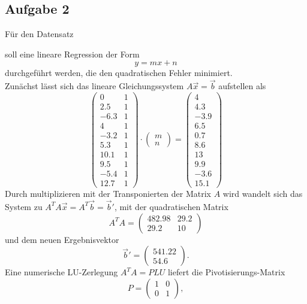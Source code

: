 \documentclass{scrartcl}
\begin{document}
\newpage
\subsection*{Aufgabe 2}
Für den Datensatz
\begin{table}[]
    \centering

\end{table}
soll eine lineare Regression der Form
\[
y = mx + n
\]
durchgeführt werden, die den quadratischen Fehler minimiert.\\
Zunächst lässt sich das lineare Gleichungssystem $A\vec{x}=\vec{b}$ aufstellen als
\[
\begin{pmatrix}
   0  & 1\\
 2.5  & 1\\
-6.3  & 1\\
   4  & 1\\ 
-3.2  & 1\\
 5.3  & 1\\
10.1  & 1\\
 9.5  & 1\\
-5.4  & 1\\
12.7  & 1
\end{pmatrix}\cdot
\begin{pmatrix}
m\\
n
\end{pmatrix} = 
\begin{pmatrix}
4\\
4.3\\
-3.9\\
6.5\\
0.7\\
8.6\\
13\\
9.9\\
-3.6\\
15.1
\end{pmatrix}
\]
Durch multiplizieren mit der Transponierten der Matrix $A$ wird wandelt sich das
System zu $A^TA\vec{x} = A^T \vec{b} = \vec{b}'$, mit der quadratischen Matrix
\[
A^TA = \begin{pmatrix}
482.98 & 29.2 \\
  29.2  &  10 
\end{pmatrix}
\]
und dem neuen Ergebnisvektor
\[
\vec{b}' = \begin{pmatrix}
541.22\\
  54.6
\end{pmatrix}\text{.}
\]
Eine numerische LU-Zerlegung $A^TA = PLU$ liefert die Pivotisierungs-Matrix
\[
P = 
\begin{pmatrix}
1 & 0\\
0 & 1
\end{pmatrix},
\]
\end{document}

